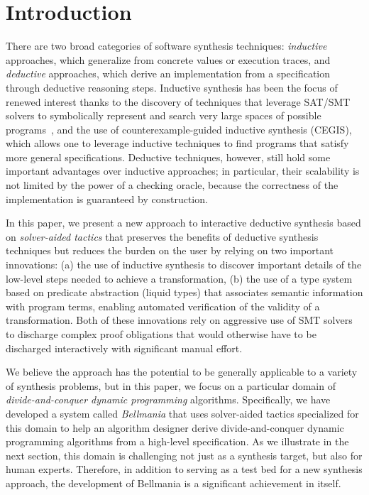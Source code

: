 \section{Introduction}
\label{intro}


\newcommand{\xidx}{i}
\newcommand{\yidx}{j}
\newcommand{\xw}[1]{w^x_{#1}}
\newcommand{\yw}[1]{w^y_{#1}}
There are two broad categories of software synthesis techniques: 
\emph{inductive} approaches, which generalize from concrete values or execution traces, and \emph{deductive} approaches, which derive an implementation from a specification through deductive reasoning steps. Inductive synthesis has been the focus of renewed interest thanks to the discovery of techniques that leverage SAT/SMT solvers to symbolically represent and search very large spaces of possible programs~\cite{APLAS09/Solar-Lezama, PLDI11/Gulwani, Onward13/Torlak}, and the use of counterexample-guided inductive synthesis (CEGIS), which allows one to leverage inductive techniques to find programs that satisfy more general specifications. Deductive techniques, however, still hold some important advantages over inductive approaches; in particular, their scalability is not limited by the power of a checking oracle, because the correctness of the implementation is guaranteed by construction.

In this paper, we present a new approach to interactive deductive synthesis based on \emph{solver-aided tactics} that preserves the benefits of deductive synthesis techniques but reduces the burden on the user by relying on two important innovations: (a) the use of inductive synthesis to discover important details of the low-level steps needed to achieve a transformation, (b) the use of a type system based on predicate abstraction (liquid types) that associates semantic information with program terms, enabling automated verification of the validity of a transformation. Both of these innovations rely on aggressive use of SMT solvers to discharge complex proof obligations that would otherwise have to be discharged interactively with significant manual effort. 

We believe the approach has the potential to be generally applicable to a variety of synthesis problems, but in this paper, we focus on a particular domain of \emph{divide-and-conquer dynamic programming} algorithms. Specifically, we have developed a system called \emph{Bellmania} that uses solver-aided tactics specialized for this domain to help an algorithm designer derive divide-and-conquer dynamic programming algorithms from a high-level specification. As we illustrate in the next section, this domain is challenging not just as a synthesis target, but also for human experts. Therefore, in addition to serving as a test bed for a new synthesis approach, the development of Bellmania is a significant achievement in itself.

